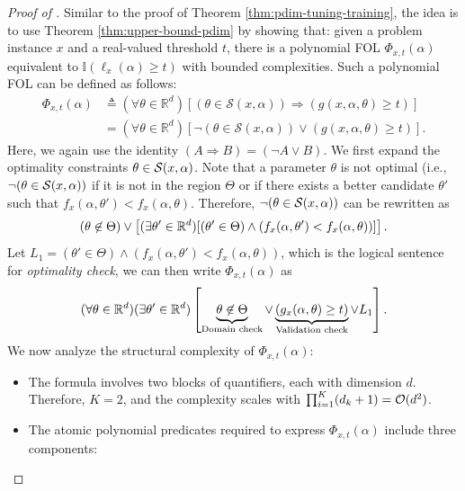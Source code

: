 \begin{proof}[Proof of ]
    Similar to the proof of Theorem \ref{thm:pdim-tuning-training}, the idea is to use Theorem \ref{thm:upper-bound-pdim} by showing that: given a problem instance $x$ and a real-valued threshold $t$, there is a polynomial FOL $\Phi_{x, t}(\alpha)$ equivalent to $\mathbb{I}(\ell_x(\alpha) \geq t)$ with bounded complexities. Such a polynomial FOL can be defined as follows:
    \begin{equation*}
        \begin{aligned}
            \Phi_{x,t}(\alpha) &\triangleq (\forall \theta \in \mathbb{R}^d) \left[ (\theta \in \mathcal{S}(x, \alpha)) \Rightarrow (g(x, \alpha, \theta) \ge t)\right] \\
            &= (\forall \theta \in \mathbb{R}^d) \left[ \neg (\theta \in \mathcal{S}(x, \alpha)) \lor (g(x, \alpha, \theta) \ge t)\right].
        \end{aligned}
    \end{equation*}
    Here, we again use the identity $(A \Rightarrow B) = (\neg A \lor B)$. We first expand the optimality constraints $\theta \in \mathcal{S}(x, \alpha)$. Note that a parameter $\theta$ is not optimal (i.e., $\neg (\theta \in \mathcal{S}(x, \alpha))$ if it is not in the region $\Theta$ or if there exists a better candidate $\theta'$ such that $f_x(\alpha, \theta') < f_x(\alpha, \theta)$. Therefore, $\neg (\theta \in \mathcal{S}(x, \alpha))$ can be rewritten as
    \[
        (\theta \not \in \Theta) \lor \left[(\exists \theta' \in \mathbb{R}^d)[(\theta' \in \Theta) \land (f_x(\alpha, \theta') < f_x(\alpha, \theta))]\right].
    \]
    Let $L_1 = (\theta' \in \Theta) \land (f_x(\alpha, \theta') < f_x(\alpha, \theta))$, which is the logical sentence for \textit{optimality check}, we can then write $\Phi_{x, t}(\alpha)$ as 
    \[
        (\forall \theta \in \mathbb{R}^d)(\exists \theta' \in \mathbb{R}^d)\left[\underbrace{\theta \not \in \Theta}_{\textup{Domain check}} \lor \underbrace{(g_x(\alpha, \theta) \geq t)}_{\textup{Validation check}} \lor L_1\right].
    \]
    We now analyze the structural complexity of $\Phi_{x, t}(\alpha)$:
    \begin{itemize}[leftmargin=*]
        \item The formula involves two blocks of quantifiers, each with dimension $d$. Therefore, $K = 2$, and the complexity scales with $\prod_{i = 1}^K(d_k + 1) = \mathcal{O}(d^2)$.
        \item The atomic polynomial predicates required to express $\Phi_{x, t}(\alpha)$ include three components:

\end{itemize}
\end{proof}
